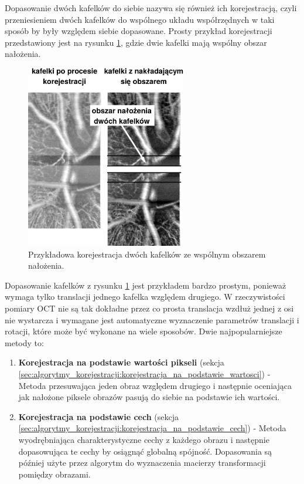 Dopasowanie dwóch kafelków do siebie nazywa się również ich korejestracją, czyli przeniesieniem dwóch kafelków do wspólnego układu współrzędnych w taki sposób by były względem siebie dopasowane. Prosty przykład korejestracji przedstawiony jest na rysunku \ref{fig:algorytmy_korejestracji:align}, gdzie dwie kafelki mają wspólny obszar nałożenia.

\begin{figure}[H]
  \centering
  \includegraphics[width=7cm]{gfx/align}
  \caption{Przykładowa korejestracja dwóch kafelków ze wspólnym obszarem nałożenia.}
  \label{fig:algorytmy_korejestracji:align}
\end{figure}

Dopasowanie kafelków z rysunku \ref{fig:algorytmy_korejestracji:align} jest przykładem bardzo prostym, ponieważ wymaga tylko translacji jednego kafelka względem drugiego. W rzeczywistości pomiary OCT nie są tak dokładne przez co prosta translacja wzdłuż jednej z osi nie wystarcza i wymagane jest automatyczne wyznaczenie parametrów translacji i rotacji, które może być wykonane na wiele sposobów. Dwie najpopularniejsze metody to:

\begin{enumerate}
\item \textbf{Korejestracja na podstawie wartości pikseli} (sekcja \ref{sec:algorytmy_korejestracji:korejestracja_na_podstawie_wartosci}) - Metoda przesuwająca jeden obraz względem drugiego i następnie oceniająca jak nałożone piksele obrazów pasują do siebie na podstawie ich wartości.
\item \textbf{Korejestracja na podstawie cech} (sekcja \ref{sec:algorytmy_korejestracji:korejestracja_na_podstawie_cech}) - Metoda wyodrębniająca charakterystyczne cechy z każdego obrazu i następnie dopasowująca te cechy by osiągnąć globalną spójność. Dopasowania są później użyte przez algorytm do wyznaczenia macierzy transformacji pomiędzy obrazami.
\end{enumerate}

